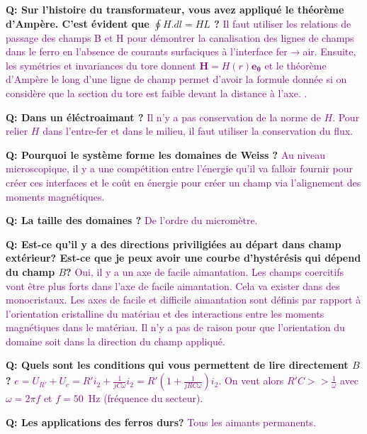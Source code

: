 \documentclass[french, a4paper, 10pt, twocolumn, landscape]{article}
\begin{document}
{ \textbf{Q: Sur l'histoire du transformateur, vous avez appliqué le théorème d'Ampère. C'est évident que $\oint H.d l = H L$ ? } \textcolor{purple}{Il faut utiliser les relations de passage des champs B et H pour démontrer la canalisation des lignes de champs dans le ferro en l'absence de courants surfaciques à l'interface fer$\rightarrow$air. Ensuite, les symétries et invariances du tore donnent $\mathbf{H}=H(r)\mathbf{e_{\theta}}$ et le théorème d'Ampère le long d'une ligne de champ permet d'avoir la formule donnée si on considère que la section du tore est faible devant la distance à l'axe.%
 .} \newline

\textbf{Q: Dans un éléctroaimant ?} \textcolor{purple}{Il n'y a pas conservation de la norme de $H$. Pour relier $H$ dans l'entre-fer et dans le milieu, il faut utiliser la conservation du flux.} \newline

 \textbf{Q: Pourquoi le système forme les domaines de Weiss ?} \textcolor{purple}{Au niveau microscopique, il y a une compétition entre l'énergie qu'il va falloir fournir pour créer ces interfaces et le coût en énergie pour créer un champ via l'alignement des moments magnétiques.} \newline

\textbf{Q: La taille des domaines ?} \textcolor{purple}{De l'ordre du micromètre.} \newline

 \textbf{Q: Est-ce qu'il y a des directions priviligiées au départ dans champ extérieur? Est-ce que je peux avoir une courbe d'hystérésis qui dépend du champ $B$?} \textcolor{purple}{Oui, il y a un axe de facile aimantation. Les champs coercitifs vont être plus forts dans l'axe de facile aimantation. Cela va exister dans des monocristaux. Les axes de facile et difficile aimantation sont définis par rapport à l'orientation cristalline du matériau et des interactions entre les moments magnétiques dans le matériau. Il n'y a pas de raison pour que l'orientation du domaine soit dans la direction du champ appliqué.} \newline

\textbf{Q:  Quels sont les conditions qui vous permettent de lire directement $B$?} \textcolor{purple}{$e = U_{R'} + U_c = R' i_2 + \frac{1}{jC\omega} i_2 = R'(1+\frac{1}{jRC\omega}) i_2$. On veut alors $R'C >> \frac{1}{\omega}$ avec $\omega=2\pi f$ et $f=50$~Hz (fréquence du secteur).} \newline

\textbf{Q: Les applications des ferros durs?} \textcolor{purple}{Tous les aimants permanents. } 
}
\end{document}
